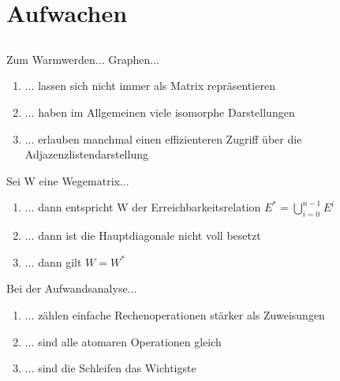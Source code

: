 

\section[Einstieg]{Aufwachen}
\subsection*{}
\begin{frame}{Zum Warmwerden...}
   Graphen...
    \begin{enumerate}
    \item { 
    ... lassen sich nicht immer als Matrix repräsentieren
    }
    \item { 
    ... haben im Allgemeinen viele isomorphe Darstellungen
    }
    \item { 
    ... erlauben manchmal einen effizienteren Zugriff über die Adjazenzlistendarstellung
    }
    \end{enumerate}

  Sei W eine Wegematrix...
    \begin{enumerate}
    \item { 
    ... dann entspricht W der Erreichbarkeitsrelation 
    	$E^*=\bigcup^{n-1}_{i=0} E^i$
    }
    \item { 
    ... dann ist die Hauptdiagonale nicht voll besetzt
    }
    \item { 
    ... dann gilt $W = W^*$
    }
    \end{enumerate}

  Bei der Aufwandsanalyse...
    \begin{enumerate}
    \item { 
    ... zählen einfache Rechenoperationen stärker als Zuweisungen
    }
    \item { 
    ... sind alle atomaren Operationen gleich
    }
    \item { 
    ... sind die Schleifen das Wichtigste
    }
    \end{enumerate}
\end{frame}

